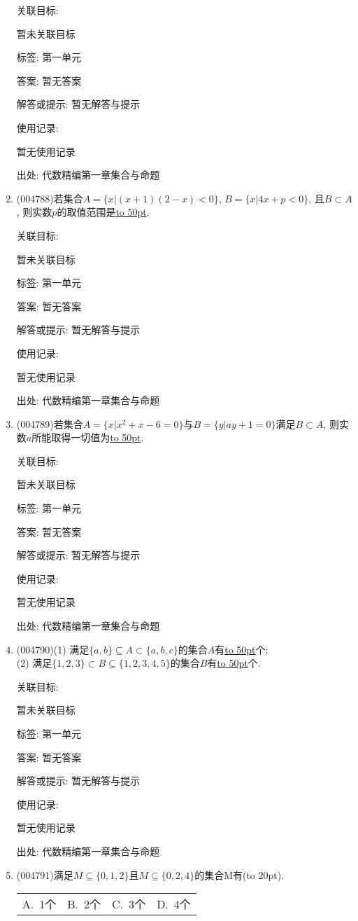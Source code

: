 \documentclass[10pt,a4paper]{article}
\newcommand{\blank}[1]{\underline{\hbox to #1pt{}}}
\newcommand{\bracket}[1]{(\hbox to #1pt{})}
\newcommand{\fourch}[4]{\par\begin{tabular}{p{.23\textwidth}p{.23\textwidth}p{.23\textwidth}p{.23\textwidth}}
A.~#1 &B.~#2& C.~#3& D.~#4
\end{tabular}}
\begin{document}
\begin{enumerate}[1.]
关联目标:

暂未关联目标



标签: 第一单元

答案: 暂无答案

解答或提示: 暂无解答与提示

使用记录:

暂无使用记录


出处: 代数精编第一章集合与命题
\item { (004788)}若集合$A=\{x|(x+1)(2-x)<0\}$, $B=\{x|4x+p<0\}$, 且$B\subset A$, 则实数$p$的取值范围是\blank{50}.


关联目标:

暂未关联目标



标签: 第一单元

答案: 暂无答案

解答或提示: 暂无解答与提示

使用记录:

暂无使用记录


出处: 代数精编第一章集合与命题
\item { (004789)}若集合$A=\{x|x^2+x-6=0\}$与$B=\{y|ay+1=0\}$满足$B\subset A$, 则实数$a$所能取得一切值为\blank{50}.


关联目标:

暂未关联目标



标签: 第一单元

答案: 暂无答案

解答或提示: 暂无解答与提示

使用记录:

暂无使用记录


出处: 代数精编第一章集合与命题
\item { (004790)}(1) 满足$\{a,b\}\subseteq A\subset \{a,b,c\}$的集合$A$有\blank{50}个;\\
(2) 满足$\{1,2,3\}\subset B\subseteq \{ 1,2,3,4,5\}$的集合$B$有\blank{50}个.


关联目标:

暂未关联目标



标签: 第一单元

答案: 暂无答案

解答或提示: 暂无解答与提示

使用记录:

暂无使用记录


出处: 代数精编第一章集合与命题
\item { (004791)}满足$M\subseteq \{0,1,2\}$且$M\subseteq \{0,2,4\}$的集合M有\bracket{20}.
\fourch{$1$个}{$2$个}{$3$个}{$4$个}



\end{enumerate}
\end{document}
